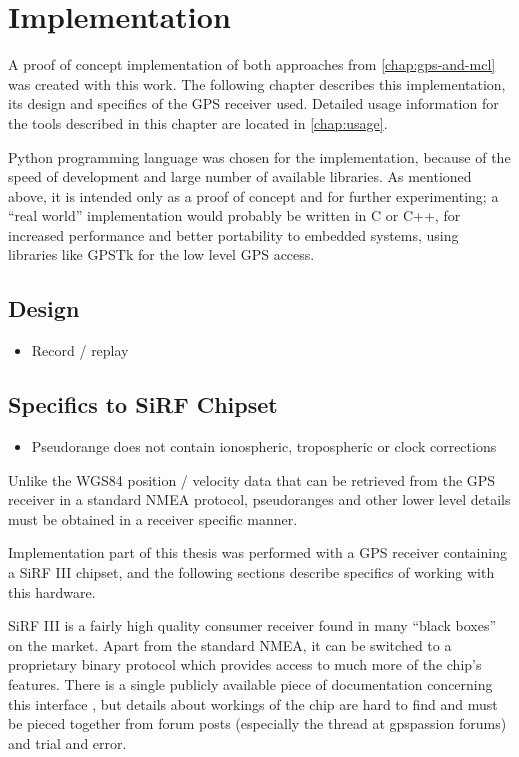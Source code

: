\chapter{Implementation}
\label{chap:implementation}

A proof of concept implementation of both approaches from \cref{chap:gps-and-mcl}
was created with this work.
The following chapter describes this implementation, its design and
specifics of the GPS receiver used.
Detailed usage information for the tools described in this chapter are located in
\cref{chap:usage}.

Python programming language was chosen for the implementation,
because of the speed of development and large number of available libraries.
As mentioned above, it is intended only as a proof of
concept and for further experimenting; a \enquote{real world} implementation
would probably be written in C or C++, for increased performance and better portability
to embedded systems, using libraries like GPSTk \cite{tolman04} for the low level GPS access.

\section{Design}
\begin{itemize}
\item Record / replay
\end{itemize}

\section{Specifics to SiRF Chipset}
\label{sec:impl-sirf}

\begin{itemize}
\item Pseudorange does not contain ionospheric, tropospheric or clock corrections
\end{itemize}

Unlike the WGS84 position / velocity data that can be retrieved from the GPS receiver in a standard
NMEA protocol, pseudoranges and other lower level details must be obtained
in a receiver specific manner.

Implementation part of this thesis was performed with a GPS receiver containing
a SiRF III chipset, and the following sections describe specifics of working with
this hardware.

SiRF III is a fairly high quality consumer receiver found in many
\enquote{black boxes} on the market.
Apart from the standard NMEA, it can be switched to a proprietary binary protocol
which provides access to much more of the chip's features.
There is a single publicly available piece of documentation concerning this
interface \cite{sirf-protocol}, but details about workings of the chip are hard
to find and must be pieced together from forum posts (especially the thread
\cite{gpspassion-sirf} at gpspassion forums) and trial and error.


